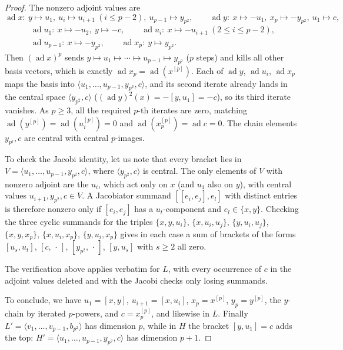 \documentclass[11pt,reqno]{amsart}
\theoremstyle{plain}
\theoremstyle{remark}
\newcommand{\ad}{\operatorname{ad}}
\newcommand{\spann}[1]{\langle #1\rangle}
\begin{document}
\begin{proof}
The nonzero adjoint values are
\[
\ad x\colon \ y\mapsto u_1,\ u_i\mapsto u_{i+1}\ (i\le p-2),\ u_{p-1}\mapsto y_{p^2},
\qquad
\ad y\colon\ x\mapsto -u_1,\ x_p\mapsto -y_{p^2},\ u_1\mapsto c,
\]
\begin{gather*}
\ad u_1\colon\ x\mapsto -u_2,\ y\mapsto -c,\qquad
\ad u_i\colon\ x\mapsto -u_{i+1}\ (2\le i\le p-2),\\
\ad u_{p-1}\colon\ x\mapsto -y_{p^2},\qquad
\ad x_p\colon\ y\mapsto y_{p^2}.
\end{gather*}
Then $(\ad x)^p$ sends
$y\mapsto u_1\mapsto\cdots\mapsto u_{p-1}\mapsto y_{p^2}$ ($p$ steps) and
kills all other basis vectors, which is exactly $\ad x_p=\ad(x^{[p]})$. Each
of $\ad y$, $\ad u_i$, $\ad x_p$ maps the basis into
$\spann{u_1,\dots,u_{p-1},y_{p^2},c}$, and its second iterate already lands
in the central space $\spann{y_{p^2},c}$
($(\ad y)^2(x)=-[y,u_1]=-c$), so its third iterate vanishes. As $p\ge3$, all
the required $p$-th iterates are zero, matching
$\ad(y^{[p]})=\ad(u_i^{[p]})=0$ and $\ad(x_p^{[p]})=\ad c=0$. The chain
elements $y_{p^j},c$ are central with central $p$-images.

To check the Jacobi identity, let us note that every bracket lies in
$V=\spann{u_1,\dots,u_{p-1},y_{p^2},c}$, where $\spann{y_{p^2},c}$ is
central. The only elements of $V$ with nonzero adjoint are the $u_i$, which
act only on $x$ (and $u_1$ also on $y$), with central values
$u_{i+1},y_{p^2},c\in V$. A Jacobiator summand $[[e_i,e_j],e_l]$ with distinct
entries is therefore nonzero only if $[e_i,e_j]$ has a $u_t$-component and
$e_l\in\{x,y\}$. Checking the three cyclic summands for the triples
$\{x,y,u_i\}$, $\{x,u_i,u_j\}$, $\{y,u_i,u_j\}$, $\{x,y,x_p\}$,
$\{x,u_i,x_p\}$, $\{y,u_i,x_p\}$ gives in each case a sum of brackets of the
forms $[u_s,u_t]$, $[c,\,\cdot\,]$, $[y_{p^2},\,\cdot\,]$, $[y,u_s]$ with
$s\ge2$ all zero.

The verification above applies verbatim for $L$, with every occurrence of $c$
in the adjoint values deleted and with the Jacobi checks only losing
summands.

To conclude, we have $u_1=[x,y]$,
$u_{i+1}=[x,u_i]$, $x_p=x^{[p]}$, $y_p=y^{[p]}$, the $y$-chain by iterated
$p$-powers, and $c=x_p^{[p]}$, and likewise in $L$. Finally
$L'=\spann{v_1,\dots,v_{p-1},b_{p^2}}$ has dimension $p$, while in $H$ the
bracket $[y,u_1]=c$ adds the top:
$H'=\spann{u_1,\dots,u_{p-1},y_{p^2},c}$ has dimension $p+1$.
\end{proof}
\end{document}
